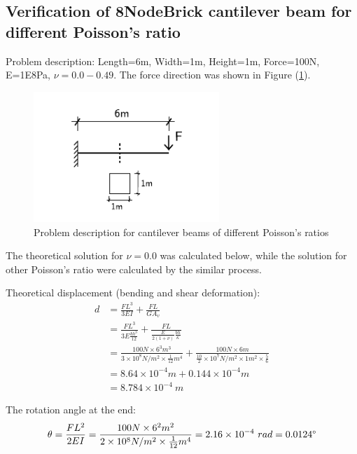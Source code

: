 \documentclass[fleqn,11pt]{article}
\begin{document}
\newpage
\subsection{Verification of 8NodeBrick cantilever beam for different Poisson's ratio}




Problem description: Length=6m, Width=1m, Height=1m, Force=100N, E=1E8Pa, $\nu=0.0-0.49$. The force direction was shown in Figure (\ref{fig Problem description for cantilever beams of different Poisson's ratios}). 

\begin{figure}[H]
  \centering
  \includegraphics[width=7cm]{../Figure-files/cantilever_6.pdf}
  \caption{Problem description for cantilever beams of different Poisson's ratios}
  \label{fig Problem description for cantilever beams of different Poisson's ratios}
\end{figure}

The theoretical solution for $\nu=0.0$ was calculated below, while the solution for other Poisson's ratio were calculated by the similar process. 

Theoretical displacement (bending and shear deformation):
\begin{equation}
  \begin{aligned}
  d &=\frac{FL^3}{3EI}+\frac{FL}{GA_v} \\
  &= \frac{FL^3}{3E\frac{bh^3}{12}}+\frac{FL}{\frac{E}{2(1+\nu)} \frac{bh}{\kappa}} \\ 
    &= \frac{100 N \times 6^3 m^3}{3\times 10^8 N/m^2 \times \frac{1}{12} m^4}+ 
    \frac{100 N\times 6 m}{\frac{10}{2} \times 10^7 N/m^2\times 1 m^2 \times \frac{5}{6}} \\ 
    &=8.64\times 10^{-4} m + 0.144 \times 10^{-4} m   \\
   & =8.784\times 10^{-4} \ m
   \end{aligned}
\end{equation}

The rotation angle at the end:
\begin{equation}
  \theta =\frac{FL^2}{2EI} 
   =\frac{100 N \times 6^2 m^2} {2\times 10^8 N/m^2 \times \frac{1}{12} m^4} 
 =2.16 \times 10^{-4} \ rad = 0.0124 \degree 
\end{equation}
\end{document}
